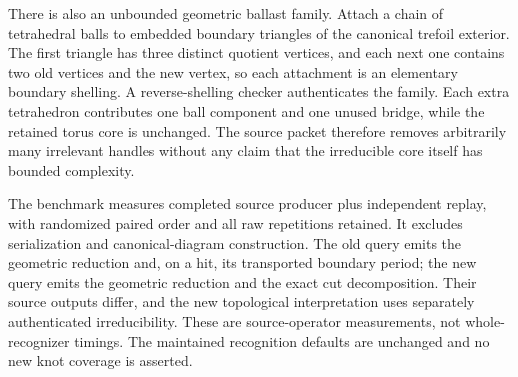There is also an unbounded geometric ballast family.  Attach a chain of
tetrahedral balls to embedded boundary triangles of the canonical trefoil
exterior.  The first triangle has three distinct quotient vertices, and
each next one contains two old vertices and the new vertex, so each
attachment is an elementary boundary shelling.  A reverse-shelling checker
authenticates the family.  Each extra tetrahedron contributes one ball
component and one unused bridge, while the retained torus core is unchanged.
The source packet therefore removes arbitrarily many irrelevant handles
without any claim that the irreducible core itself has bounded complexity.



The benchmark measures completed source producer plus independent replay,
with randomized paired order and all raw repetitions retained.  It excludes
serialization and canonical-diagram construction.  The old query emits
the geometric reduction and, on a hit, its transported boundary period;
the new query emits the geometric reduction and the exact cut decomposition.
Their source outputs differ, and the new topological interpretation uses
separately authenticated irreducibility.  These are source-operator
measurements, not whole-recognizer timings.  The maintained recognition
defaults are unchanged and no new knot coverage is asserted.
